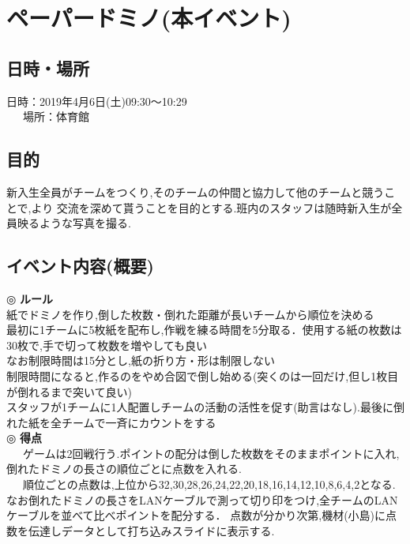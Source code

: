 \documentclass[a4j]{jarticle}
\begin{document}
\section{ペーパードミノ(本イベント)}
\subsection{日時・場所}
日時：2019年4月6日(土)09:30〜10:29\\
\ \ \ 場所：体育館\\
\subsection{目的}
新入生全員がチームをつくり,そのチームの仲間と協力して他のチームと競うことで,より
交流を深めて貰うことを目的とする.班内のスタッフは随時新入生が全員映るような写真を撮る.
\subsection{イベント内容(概要)}
\hspace{-5mm}
◎ \textbf{ルール} \\
紙でドミノを作り,倒した枚数・倒れた距離が長いチームから順位を決める \\
最初に1チームに5枚紙を配布し,作戦を練る時間を5分取る．使用する紙の枚数は30枚で,手で切って枚数を増やしても良い \\
なお制限時間は15分とし,紙の折り方・形は制限しない \\
制限時間になると,作るのをやめ合図で倒し始める(突くのは一回だけ,但し1枚目が倒れるまで突いて良い) \\
スタッフが1チームに1人配置しチームの活動の活性を促す(助言はなし).最後に倒れた紙を全チームで一斉にカウントをする \\
◎ \textbf{得点} \\
\ \ \ ゲームは2回戦行う.ポイントの配分は倒した枚数をそのままポイントに入れ,倒れたドミノの長さの順位ごとに点数を入れる.\\
\ \ \ 順位ごとの点数は,上位から32,30,28,26,24,22,20,18,16,14,12,10,8,6,4,2となる.
なお倒れたドミノの長さをLANケーブルで測って切り印をつけ,全チームのLANケーブルを並べて比べポイントを配分する．
点数が分かり次第,機材(小島)に点数を伝達しデータとして打ち込みスライドに表示する.
\end{document}
